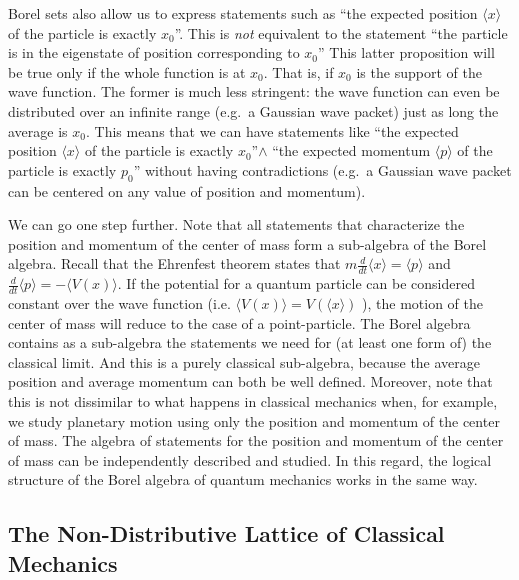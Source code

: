 \documentclass[11pt, executivepaper]{article}
\begin{document}
Borel sets also allow us to express statements such as ``the expected position $\langle x \rangle$ of the particle is exactly $x_0$''. This is \emph{not} equivalent to the statement ``the particle is in the eigenstate of position corresponding to $x_0$'' This latter proposition will be true only if the whole function is at $x_0$. That is, if $x_0$ is the support of the wave function. The former is much less stringent: the wave function can even be distributed over an infinite range (e.g.\ a Gaussian wave packet) just as long the average is $x_0$. This means that we can have statements like ``the expected position $\langle x \rangle$ of the particle is exactly $x_0$''$\wedge$ ``the expected momentum $\langle p \rangle$ of the particle is exactly $p_0$'' without having contradictions (e.g.\ a Gaussian wave packet can be centered on any value of position and momentum).

We can go one step further. Note that all statements that characterize the position and momentum of the center of mass form a sub-algebra of the Borel algebra. Recall that the Ehrenfest theorem states that $m \frac{d}{dt}\langle x \rangle = \langle p \rangle$ and $ \frac{d}{dt}\langle p \rangle = - \langle V(x) \rangle$. If the potential for a quantum particle can be considered constant over the wave function (i.e. $\langle V(x) \rangle = V(\langle x \rangle)$ ), the motion of the center of mass will reduce to the case of a point-particle. The Borel algebra contains as a sub-algebra the statements we need for (at least one form of) the classical limit. And this is a purely classical sub-algebra, because the average position and average momentum can both be well defined. Moreover, note that this is not dissimilar to what happens in classical mechanics when, for example, we study planetary motion using only the position and momentum of the center of mass. The algebra of statements for the position and momentum of the center of mass can be independently described and studied. In this regard, the logical structure of the Borel algebra of quantum mechanics works in the same way.

\subsection{The Non-Distributive Lattice of Classical Mechanics}
\end{document}
